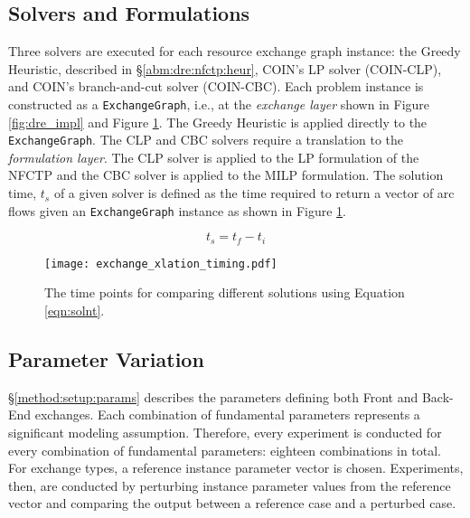 \subsection{Solvers and Formulations}

Three solvers are executed for each resource exchange graph instance: the Greedy
Heuristic, described in \S \ref{abm:dre:nfctp:heur}, COIN's LP solver
(COIN-CLP), and COIN's branch-and-cut solver (COIN-CBC). Each problem instance
is constructed as a \texttt{ExchangeGraph}, i.e., at the \textit{exchange layer}
shown in Figure \ref{fig:dre_impl} and Figure \ref{fig:dre_time}. The Greedy
Heuristic is applied directly to the \texttt{ExchangeGraph}. The CLP and CBC
solvers require a translation to the \textit{formulation layer}. The CLP solver
is applied to the LP formulation of the NFCTP and the CBC solver is applied to
the MILP formulation. The solution time, $t_s$ of a given solver is defined as
the time required to return a vector of arc flows given an
\texttt{ExchangeGraph} instance as shown in Figure \ref{fig:dre_time}.

\begin{equation}\label{eqn:solnt}
t_s = t_f - t_i
\end{equation}

\begin{figure}
  \begin{center}
    \texttt{[image: exchange\_xlation\_timing.pdf]}
    \caption[]{
      \label{fig:dre_time}
      The time points for comparing different solutions using Equation \ref{eqn:solnt}.}
  \end{center}
\end{figure}


\subsection{Parameter Variation}

\S \ref{method:setup:params} describes the parameters defining both Front and
Back-End exchanges. Each combination of fundamental parameters represents a
significant modeling assumption. Therefore, every experiment is conducted for
every combination of fundamental parameters: eighteen combinations in total. For
exchange types, a reference instance parameter vector is chosen. Experiments,
then, are conducted by perturbing instance parameter values from the reference
vector and comparing the output between a reference case and a perturbed case.

